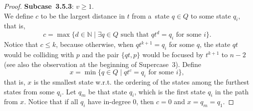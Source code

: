 \documentclass{amsart}
\renewcommand{\le}{\leqslant}
\renewcommand{\ge}{\geqslant}
\begin{document}
\begin{proof}
\textbf{Subcase~3.5.3}: $v \ge 1$.\\
We define $c$ to be the largest distance in $t$ from a~state $q \in Q$ to some state $q_i$, that is,
$$c = \max\{d \in \mathbb{N} \mid \exists q\in Q\text{ such that }q t^d = q_i\text{ for some }i\}.$$
Notice that $c \le k$, because otherwise, when $qt^{k+1}=q_i$ for some $q$, the state $qt$ would be colliding with $p$ and the pair $\{qt,p\}$ would be focused by $t^{k+1}$ to $n-2$ (see also the observation at the beginning of Supercase~3).
Define
$$x = \min\{q\in Q \mid q t^c = q_i\text{ for some }i\},$$
that is, $x$ is the smallest state w.r.t. the ordering of the states among the furthest states from some $q_i$.
Let $q_m$ be that state $q_i$, which is the first state $q_i$ in the path from $x$.
Notice that if all $q_i$ have in-degree 0, then $c = 0$ and $x = q_m = q_1$.


\end{proof}
\end{document}
